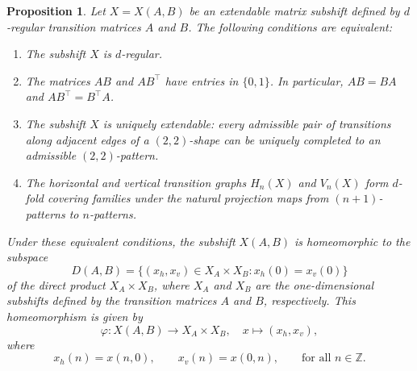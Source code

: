 \documentclass[10pt,a4paper]{amsart}
\newtheorem{proposition}{Proposition}
\begin{document}
\begin{proposition}\label{prop:ext_matrix_subshift_is_regular}
Let $X=X(A,B)$ be an extendable matrix subshift defined by $d$-regular transition matrices $A$ and $B$. The following conditions are equivalent:
\begin{enumerate}
  \item The subshift $X$ is $d$-regular.
  \item The matrices $AB$ and $AB^\top$ have entries in $\{0,1\}$. In particular, $AB = BA$ and $AB^\top = B^\top A$.
  \item The subshift $X$ is uniquely extendable: every admissible pair of transitions along adjacent edges of a $(2,2)$-shape can be uniquely completed to an admissible $(2,2)$-pattern.
  \item The horizontal and vertical transition graphs $H_n(X)$ and $V_n(X)$ form $d$-fold covering families under the natural projection maps from $(n+1)$-patterns to $n$-patterns.
\end{enumerate}
Under these equivalent conditions, the subshift \( X(A, B) \) is homeomorphic to the subspace
\[
D(A,B)=\{ (x_h,x_v)\in X_A\times X_B : x_h(0)=x_v(0)  \}
\]
of the direct product \( X_A \times X_B \), where \( X_A \) and \( X_B \) are the one-dimensional subshifts defined by the transition matrices \( A \) and \( B \), respectively. This homeomorphism is given by
\[
\varphi: X(A, B)\rightarrow X_A \times X_B,  \quad  x \mapsto (x_h, x_v),
\]
where
\[
x_h(n) = x(n, 0), \qquad x_v(n) = x(0, n), \qquad \text{for all } n \in \mathbb{Z}.
\]
\end{proposition}
\end{document}
